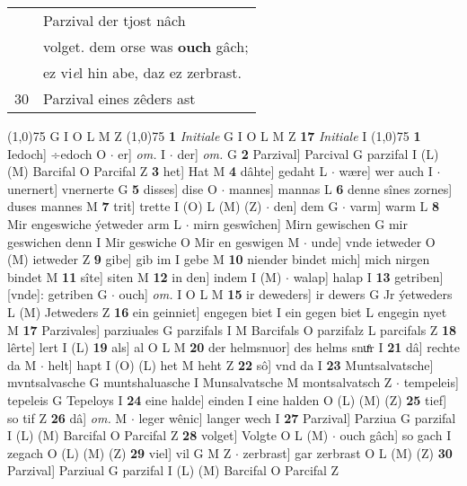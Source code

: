 \documentclass[8pt,a4paper,notitlepage]{article}
\begin{document}
\begin{table}[ht]
\begin{minipage}[t]{0.5\linewidth}
\begin{tabular}{rl}
 & Parzival der tjost nâch\\ 
 & volget. dem orse was \textbf{ouch} gâch;\\ 
 & ez vi\textit{e}l hin abe, daz ez zerbrast.\\ 
30 & Parzival eines zêders ast\\ 
\end{tabular}
\scriptsize
\line(1,0){75} \newline
G I O L M Z \newline
\line(1,0){75} \newline
\textbf{1} \textit{Initiale} G I O L M Z  \textbf{17} \textit{Initiale} I  \newline
\line(1,0){75} \newline
\textbf{1} Iedoch] ÷edoch O  $\cdot$ er] \textit{om.} I  $\cdot$ der] \textit{om.} G \textbf{2} Parzival] Parcival G parzifal I (L) (M) Barcifal O Parcifal Z \textbf{3} het] Hat M \textbf{4} dâhte] gedaht L  $\cdot$ wære] wer auch I  $\cdot$ unernert] vnernerte G \textbf{5} disses] dise O  $\cdot$ mannes] mannas L \textbf{6} denne sînes zornes] duses mannes M \textbf{7} trit] trette I (O) L (M) (Z)  $\cdot$ den] dem G  $\cdot$ varm] warm L \textbf{8} Mir engeswiche ýetweder arm L  $\cdot$ mirn geswîchen] Mirn gewischen G mir geswichen denn I Mir geswiche O Mir en geswigen M  $\cdot$ unde] vnde ietweder O (M) ietweder Z \textbf{9} gibe] gib im I gebe M \textbf{10} niender bindet mich] mich nirgen bindet M \textbf{11} sîte] siten M \textbf{12} in den] indem I (M)  $\cdot$ walap] halap I \textbf{13} getriben] [vnde]: getriben G  $\cdot$ ouch] \textit{om.} I O L M \textbf{15} ir deweders] ir dewers G Jr ýetweders L (M) Jetweders Z \textbf{16} ein geinniet] engegen biet I ein gegen biet L engegin nyet M \textbf{17} Parzivales] parziuales G parzifals I M Barcifals O parzifalz L parcifals Z \textbf{18} lêrte] lert I (L) \textbf{19} als] al O L M \textbf{20} der helmsnuor] des helms snuͤr I \textbf{21} dâ] rechte da M  $\cdot$ helt] hapt I (O) (L) het M heht Z \textbf{22} sô] vnd da I \textbf{23} Muntsalvatsche] mvntsalvasche G muntshaluasche I Munsalvatsche M montsalvatsch Z  $\cdot$ tempeleis] tepeleis G Tepeloys I \textbf{24} eine halde] einden I eine halden O (L) (M) (Z) \textbf{25} tief] so tif Z \textbf{26} dâ] \textit{om.} M  $\cdot$ leger wênic] langer wech I \textbf{27} Parzival] Parziua G parzifal I (L) (M) Barcifal O Parcifal Z \textbf{28} volget] Volgte O L (M)  $\cdot$ ouch gâch] so gach I zegach O (L) (M) (Z) \textbf{29} viel] vil G M Z  $\cdot$ zerbrast] gar zerbrast O L (M) (Z) \textbf{30} Parzival] Parziual G parzifal I (L) (M) Barcifal O Parcifal Z \newline

\end{minipage}
\end{table}
\end{document}
